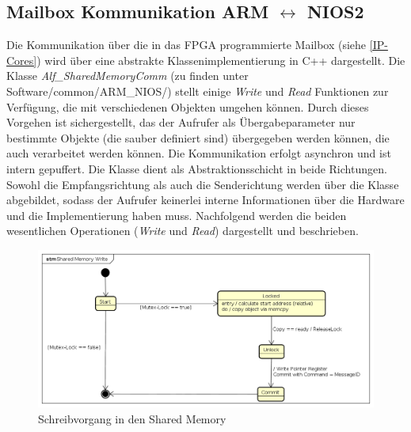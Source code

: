 \subsection{Mailbox Kommunikation ARM $\leftrightarrow$ NIOS2}
Die Kommunikation über die in das \ac{FPGA} programmierte Mailbox (siehe \ref{IP-Cores}) wird über eine abstrakte Klassenimplementierung in C++ dargestellt. Die Klasse \textit{Alf\_SharedMemoryComm} (zu finden unter Software/common/ARM\_NIOS/) stellt einige \textit{Write} und \textit{Read} Funktionen zur Verfügung, die mit verschiedenen Objekten umgehen können. Durch dieses Vorgehen ist sichergestellt, das der Aufrufer als Übergabeparameter nur bestimmte Objekte (die sauber definiert sind) übergegeben werden können, die auch verarbeitet werden können. Die Kommunikation erfolgt asynchron und ist intern gepuffert. Die Klasse dient als Abstraktionsschicht in beide Richtungen. Sowohl die Empfangsrichtung als auch die Senderichtung werden über die Klasse abgebildet, sodass der Aufrufer keinerlei interne Informationen über die Hardware und die Implementierung haben muss.
Nachfolgend werden die beiden wesentlichen Operationen (\textit{Write} und \textit{Read}) dargestellt und beschrieben.

\begin{figure}
	\includegraphics[width=\textwidth]{Abb/Shared_mem_Write.png}
	\caption{Schreibvorgang in den Shared Memory}
	\label{Software:Arm:SharedMemWrite}
\end{figure}

